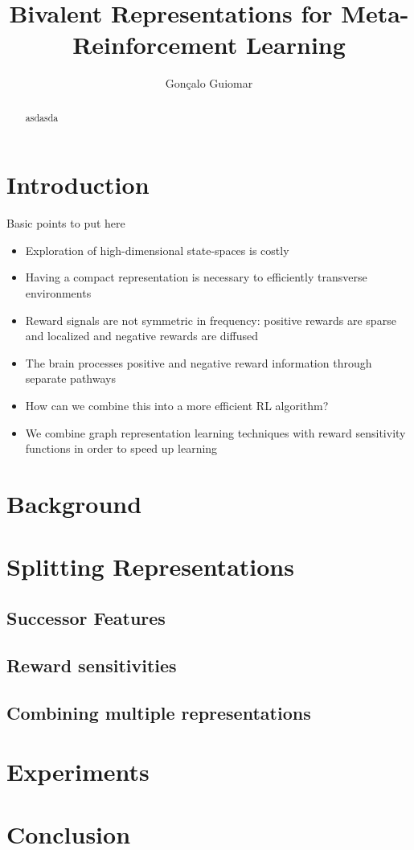 \documentclass{article}
\title{Bivalent Representations for Meta-Reinforcement Learning}
\author{
  Gonçalo Guiomar \\
}
\begin{document}
\maketitle

\begin{abstract}
  asdasda
\end{abstract}

\section{Introduction}

Basic points to put here

\begin{itemize}
  \item Exploration of high-dimensional state-spaces is costly
  \item Having a compact representation is necessary to efficiently transverse environments
  \item Reward signals are not symmetric in frequency: positive rewards are sparse and localized and negative rewards are diffused
  \item The brain processes positive and negative reward information through separate pathways
  \item How can we combine this into a more efficient RL algorithm?
  \item We combine graph representation learning techniques with reward sensitivity functions in order to speed up learning
\end{itemize}

\section{Background}

\section{Splitting Representations}
\subsection{Successor Features}
\subsection{Reward sensitivities}
\subsection{Combining multiple representations}


\section{Experiments}

\section{Conclusion}

% 
% 
\end{document}

